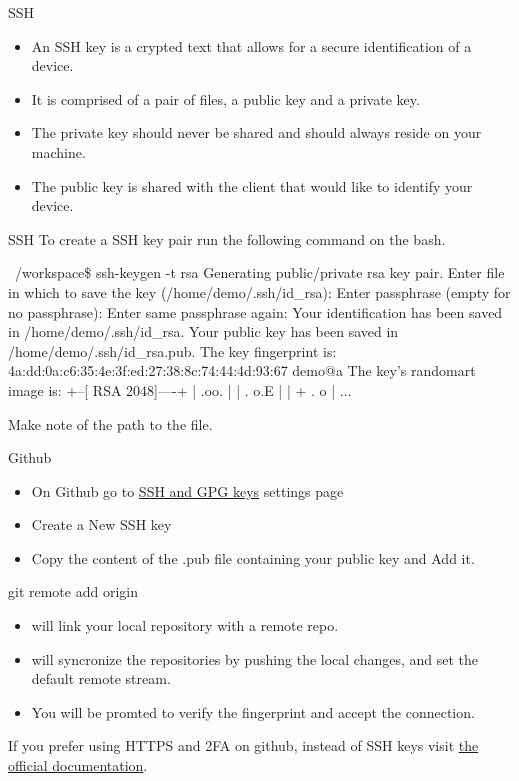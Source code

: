 \begin{frame}[fragile]{SSH}
\begin{itemize}
    \item An SSH key is a crypted text that allows for a secure identification of a device.
    \item It is comprised of a pair of files, a public key and a private key.
    \item The private key should never be shared and should always reside on your machine.
    \item The public key is shared with the client that would like to identify your device.
\end{itemize}
\end{frame}

\begin{frame}[fragile]{SSH\insertcontinuationtext}
    To create a SSH key pair run the following command on the bash.
    \begin{shellblock}
~/workspace\$ ssh-keygen -t rsa
Generating public/private rsa key pair.
Enter file in which to save the key (/home/demo/.ssh/id_rsa): 
Enter passphrase (empty for no passphrase): 
Enter same passphrase again: 
Your identification has been saved in /home/demo/.ssh/id_rsa.
Your public key has been saved in /home/demo/.ssh/id_rsa.pub.
The key fingerprint is:
4a:dd:0a:c6:35:4e:3f:ed:27:38:8c:74:44:4d:93:67 demo@a
The key's randomart image is:
+--[ RSA 2048]----+
|          .oo.   |
|         .  o.E  |
|        + .  o   |
...
    \end{shellblock}
Make note of the path to the  file.
\end{frame}

\begin{frame}[fragile]{Github \insertcontinuationtext}
    \begin{itemize}
        \item On Github go to \alert{\href{https://github.com/settings/keys}{SSH and GPG keys}} settings page
        \item Create a New SSH key
        \item Copy the content of the .pub file containing your public key and Add it.
    \end{itemize}
\end{frame}

\begin{frame}[fragile]{git remote add origin}
    \begin{itemize}
        \item {} will link your local repository with a remote repo.
        \item {} will syncronize the repositories by \alert{pushing} the local changes, and set the default remote stream.
        \item You will be promted to verify the fingerprint and accept the connection.
    \end{itemize}
        If you prefer using HTTPS and 2FA on github, instead of SSH keys visit \href{https://docs.github.com/en/github/getting-started-with-github/about-remote-repositories#cloning-with-https-urls}{the official documentation}.
\end{frame}


